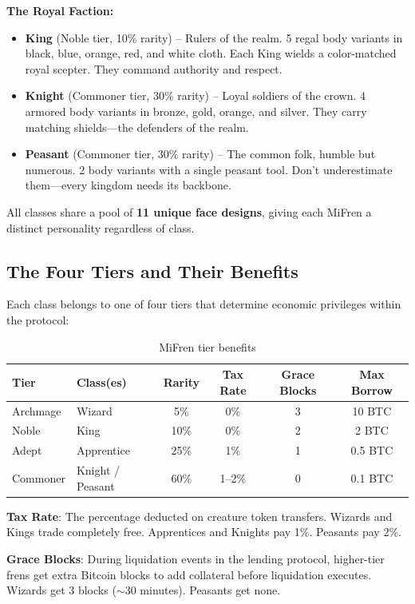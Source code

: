 \documentclass[11pt,a4paper]{article}
\begin{document}
\textbf{The Royal Faction:}
\begin{itemize}
    \item \textbf{King} (Noble tier, 10\% rarity) -- Rulers of the realm. 5 regal body variants in black, blue, orange, red, and white cloth. Each King wields a color-matched royal scepter. They command authority and respect.
    \item \textbf{Knight} (Commoner tier, 30\% rarity) -- Loyal soldiers of the crown. 4 armored body variants in bronze, gold, orange, and silver. They carry matching shields---the defenders of the realm.
    \item \textbf{Peasant} (Commoner tier, 30\% rarity) -- The common folk, humble but numerous. 2 body variants with a single peasant tool. Don't underestimate them---every kingdom needs its backbone.
\end{itemize}

All classes share a pool of \textbf{11 unique face designs}, giving each MiFren a distinct personality regardless of class.

\subsection{The Four Tiers and Their Benefits}

Each class belongs to one of four tiers that determine economic privileges within the protocol:

\begin{table}[h]
\centering
\begin{tabular}{|l|l|c|c|c|c|}
\hline
\textbf{Tier} & \textbf{Class(es)} & \textbf{Rarity} & \textbf{Tax Rate} & \textbf{Grace Blocks} & \textbf{Max Borrow} \\
\hline
Archmage & Wizard & 5\% & 0\% & 3 & 10 BTC \\
Noble & King & 10\% & 0\% & 2 & 2 BTC \\
Adept & Apprentice & 25\% & 1\% & 1 & 0.5 BTC \\
Commoner & Knight / Peasant & 60\% & 1--2\% & 0 & 0.1 BTC \\
\hline
\end{tabular}
\caption{MiFren tier benefits}
\end{table}

\textbf{Tax Rate}: The percentage deducted on creature token transfers. Wizards and Kings trade completely free. Apprentices and Knights pay 1\%. Peasants pay 2\%.

\textbf{Grace Blocks}: During liquidation events in the lending protocol, higher-tier frens get extra Bitcoin blocks to add collateral before liquidation executes. Wizards get 3 blocks ($\sim$30 minutes). Peasants get none.
\end{document}
